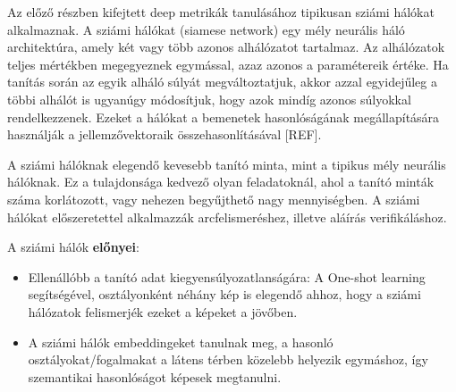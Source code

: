 Az előző részben kifejtett deep metrikák tanulásához tipikusan sziámi hálókat alkalmaznak. A sziámi hálókat (siamese network) egy mély neurális háló architektúra, amely két vagy több azonos alhálózatot tartalmaz. Az alhálózatok teljes mértékben megegyeznek egymással, azaz azonos a paramétereik értéke. Ha tanítás során az egyik alháló súlyát megváltoztatjuk, akkor azzal egyidejűleg a többi alhálót is ugyanúgy módosítjuk, hogy azok mindíg azonos súlyokkal rendelkezzenek. Ezeket a hálókat a bemenetek hasonlóságának megállapítására használják a jellemzővektoraik összehasonlításával [REF]. 

A sziámi hálóknak elegendő kevesebb tanító minta, mint a tipikus mély neurális hálóknak. Ez a tulajdonsága kedvező olyan feladatoknál, ahol a tanító minták száma korlátozott, vagy nehezen begyűjthető nagy mennyiségben. A sziámi hálókat előszeretettel alkalmazzák arcfelismeréshez, illetve aláírás verifikáláshoz.

A sziámi hálók \textbf{előnyei}:
\begin{itemize}
	\item Ellenállóbb a tanító adat kiegyensúlyozatlanságára: A One-shot learning segítségével, osztályonként néhány kép is elegendő ahhoz, hogy a sziámi hálózatok felismerjék ezeket a képeket a jövőben.
	\item A sziámi hálók embeddingeket tanulnak meg, a hasonló osztályokat/fogalmakat a látens térben közelebb helyezik egymáshoz, így szemantikai hasonlóságot képesek megtanulni.
\end{itemize}





